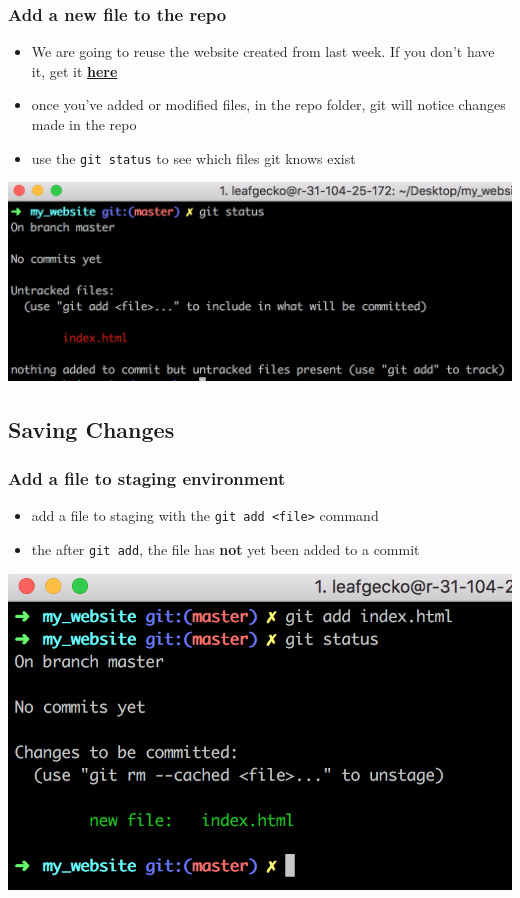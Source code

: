 \documentclass[12pt]{beamer}
\begin{document}
\begin{frame}
\frametitle{Add a new file to the repo}
\begin{itemize}
\item We are going to reuse the website created from last week. If you don't have it, get it \href{https://pastebin.com/raw/32W4Ct7k}{\textbf{here}}
\item once you've added or modified files, in the repo folder, git will notice changes made in the repo
\item use the \texttt{git status} to see which files git knows exist
\end{itemize}
\begin{center}
\includegraphics[width=0.5\linewidth]{git_status}
\end{center}
\end{frame}


\subsection{Saving Changes}
\begin{frame}
\frametitle{Add a file to staging environment}

\begin{itemize}
	\item add a file to staging with the \texttt{git add <file>} command
	\item the after \texttt{git add}, the file has \textbf{not} yet been added to a commit
\end{itemize}
\begin{center}
	\includegraphics[width=0.7\linewidth]{git_add_screenshot}
\end{center}
\end{frame}
\end{document}
